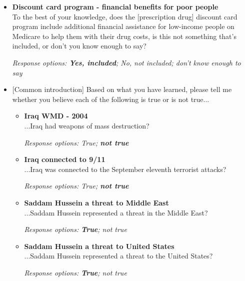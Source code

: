 \documentclass[12pt, letterpaper]{article}
\begin{document}
\begin{itemize} \item \textbf{Discount card program - financial benefits for poor people}\\
To the best of your knowledge, does the [prescription drug] discount card program include additional financial assistance for low-income people on Medicare to help them with their drug costs, is this not something that's included, or don't you know enough to say?

\textit{Response options: \textbf{Yes, included}; No, not included; don't know enough to say} 
\end{itemize}

\begin{itemize}

\item{[Common introduction] Based on what you have learned, please tell me whether you believe each of the following is true or is not true...

\begin{itemize}
\item \textbf{Iraq WMD - 2004}\\
...Iraq had weapons of mass destruction?

\textit{Response options: True; \textbf{not true}} 
\end{itemize}}

\begin{itemize}
\item \textbf{Iraq connected to 9/11}\\
...Iraq was connected to the September eleventh terrorist attacks?

\textit{Response options: True; \textbf{not true}} 
\end{itemize}

\begin{itemize}
\item \textbf{Saddam Hussein a threat to Middle East}\\
...Saddam Hussein represented a threat in the Middle East?

\textit{Response options: \textbf{True}; not true} 
\end{itemize}

\begin{itemize}
\item \textbf{Saddam Hussein a threat to United States}\\
...Saddam Hussein represented a threat to the United States?

\textit{Response options: \textbf{True}; not true} 
\end{itemize}

\end{itemize}
\end{document}
